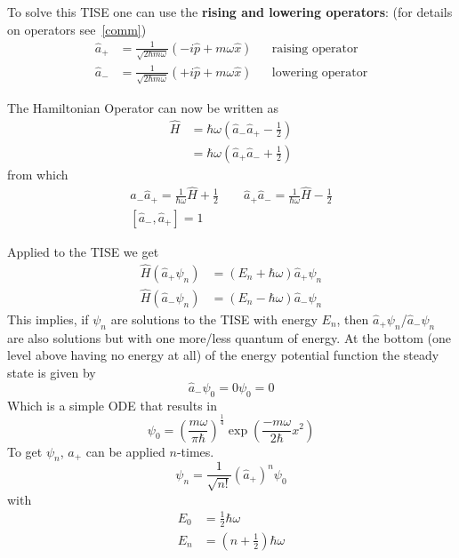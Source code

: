 
To solve this TISE one can use the \textbf{rising and lowering operators}: (for details on operators see~\ref{comm})
\begin{align*}
    \hat{a}_{+} & = \frac{1}{\sqrt{2\hbar m \omega}}\left(-i\hat{p}+m\omega\hat{x}\right) &  & \text{raising operator}  \\
    \hat{a}_{-} & = \frac{1}{\sqrt{2\hbar m \omega}}\left(+i\hat{p}+m\omega\hat{x}\right) &  & \text{lowering operator}
\end{align*}


The Hamiltonian Operator can now be written as
\noindent\begin{align*}
    \hat{H} & =\hbar\omega\left(\hat{a}_{-}\hat{a}_{+}-\frac{1}{2}\right) \\
            & =\hbar\omega\left(\hat{a}_{+}\hat{a}_{-}+\frac{1}{2}\right)
\end{align*}
from which
\noindent\begin{gather*}
    \hat{a}_{-}\hat{a}_{+}=\frac{1}{\hbar\omega}\hat{H}+\frac{1}{2} \quad\quad \hat{a}_{+}\hat{a}_{-}=\frac{1}{\hbar\omega}\hat{H}-\frac{1}{2}\\
    \left[\hat{a}_{-},\hat{a}_{+}\right] = 1
\end{gather*}


Applied to the TISE we get
\begin{align*}
    \widehat{H}(\hat{a}_{+}\psi_n) & = (E_n+\hbar\omega)\hat{a}_{+}\psi_n \\
    \widehat{H}(\hat{a}_{-}\psi_n) & = (E_n-\hbar\omega)\hat{a}_{-}\psi_n
\end{align*}
This implies, if $\psi_n$ are solutions to the TISE with energy $E_n$, then $\hat{a}_{+}\psi_n$/$\hat{a}_{-}\psi_n$ are also solutions but with one more/less quantum of energy.
\newpar{}
At the bottom (one level above having no energy at all) of the energy potential function the steady state is given by
\begin{equation*}
    \hat{a}_{-}\psi_0 = 0\psi_0 = 0
\end{equation*}
Which is a simple ODE that results in
\begin{equation*}
    \psi_0 = {\left(\frac{m\omega}{\pi\hbar}\right)}^{\frac{1}{4}}\exp\left(\frac{-m\omega}{2\hbar}x^2\right)
\end{equation*}
To get $\psi_n$, $\hat{a}_{+}$ can be applied $n$-times.
\begin{equation*}
    \psi_n = \frac{1}{\sqrt{n!}}{\left(\hat{a}_{+}\right)}^n \psi_0
\end{equation*}
with
\begin{align*}
    E_0 & = \frac{1}{2}\hbar\omega     \\
    E_n & = (n+\frac{1}{2})\hbar\omega
\end{align*}

